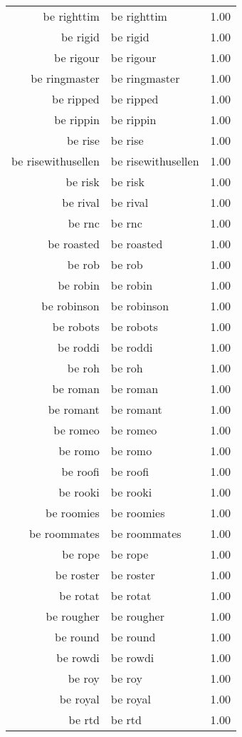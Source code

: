 \begin{table}[ht]
\begin{tabular}{rlr}
  be righttim & be righttim & 1.00 \\ 
  be rigid & be rigid & 1.00 \\ 
  be rigour & be rigour & 1.00 \\ 
  be ringmaster & be ringmaster & 1.00 \\ 
  be ripped & be ripped & 1.00 \\ 
  be rippin & be rippin & 1.00 \\ 
  be rise & be rise & 1.00 \\ 
  be risewithusellen & be risewithusellen & 1.00 \\ 
  be risk & be risk & 1.00 \\ 
  be rival & be rival & 1.00 \\ 
  be rnc & be rnc & 1.00 \\ 
  be roasted & be roasted & 1.00 \\ 
  be rob & be rob & 1.00 \\ 
  be robin & be robin & 1.00 \\ 
  be robinson & be robinson & 1.00 \\ 
  be robots & be robots & 1.00 \\ 
  be roddi & be roddi & 1.00 \\ 
  be roh & be roh & 1.00 \\ 
  be roman & be roman & 1.00 \\ 
  be romant & be romant & 1.00 \\ 
  be romeo & be romeo & 1.00 \\ 
  be romo & be romo & 1.00 \\ 
  be roofi & be roofi & 1.00 \\ 
  be rooki & be rooki & 1.00 \\ 
  be roomies & be roomies & 1.00 \\ 
  be roommates & be roommates & 1.00 \\ 
  be rope & be rope & 1.00 \\ 
  be roster & be roster & 1.00 \\ 
  be rotat & be rotat & 1.00 \\ 
  be rougher & be rougher & 1.00 \\ 
  be round & be round & 1.00 \\ 
  be rowdi & be rowdi & 1.00 \\ 
  be roy & be roy & 1.00 \\ 
  be royal & be royal & 1.00 \\ 
  be rtd & be rtd & 1.00 \\ 

\end{tabular}
\end{table}
